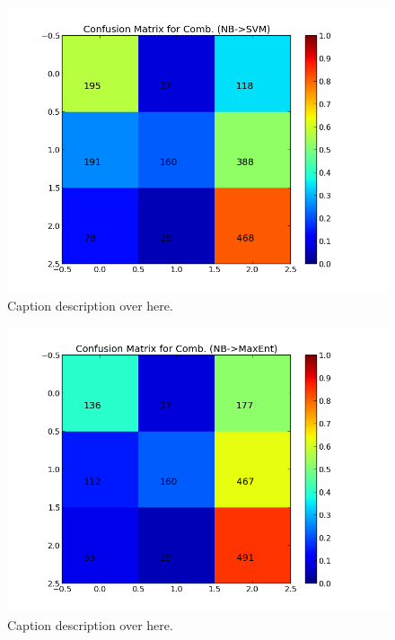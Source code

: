 \begin{minipage}[s]{\linewidth}
     \begin{minipage}{0.45\linewidth}
          \begin{figure}[H]
               \includegraphics[width=\linewidth]{../img/plots/grid/confusion_matrix_Comb-NB-SVM.png}
           \caption[Results overview across models]{Caption description over here.}
           \label{fig:confmat_nb_svm}
          \end{figure}
     \end{minipage}
     \hspace{0.05\linewidth}
     \begin{minipage}{0.45\linewidth}
          \begin{figure}[H]
               \includegraphics[width=\linewidth]{../img/plots/grid/confusion_matrix_Comb-NB-MaxEnt.png}
           \caption[Results overview across models]{Caption description over here.}
           \label{fig:confmat_nb_maxent}
          \end{figure}
     \end{minipage}
\end{minipage}


